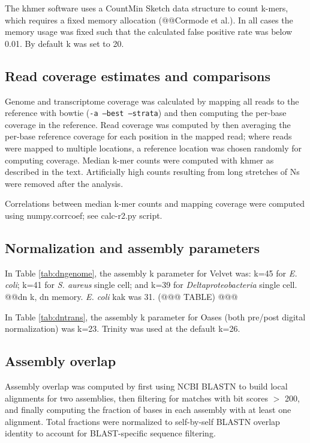 \documentclass[10pt]{article}
\begin{document}
The khmer software uses a CountMin Sketch data structure to count k-mers,
which requires a fixed memory allocation (@@Cormode et al.).  In all cases
the memory usage was fixed such that the calculated false positive rate was
below 0.01.  By default k was set to 20.

\subsection*{Read coverage estimates and comparisons}

Genome and transcriptome coverage was calculated by mapping all reads
to the reference with bowtie ({\tt -a --best --strata}) and then
computing the per-base coverage in the reference.  Read coverage was
computed by then averaging the per-base reference coverage for each
position in the mapped read; where reads were mapped to multiple
locations, a reference location was chosen randomly for computing
coverage.  Median k-mer counts were computed with khmer as described
in the text.  Artificially high counts resulting from long stretches
of Ns were removed after the analysis.

Correlations between median k-mer counts and mapping coverage were
computed using numpy.corrcoef; see calc-r2.py script.

\subsection*{Normalization and assembly parameters}

In Table \ref{tab:dngenome}, the assembly k parameter for Velvet was:
k=45 for {\em E. coli}; k=41 for {\em S. aureus} single cell; and k=39
for {\em Deltaproteobacteria} single cell.  @@dn k, dn memory.
{\em E. coli} kak was 31.  (@@@ TABLE) @@@

In Table \ref{tab:dntrans}, the assembly k parameter for Oases (both
pre/post digital normalization) was k=23.  Trinity was used at the
default k=26.

\subsection*{Assembly overlap}

Assembly overlap was computed by first using NCBI BLASTN to build local
alignments for two assemblies, then filtering for matches with bit scores
$>$ 200, and finally computing the fraction of bases in each assembly
with at least one alignment.  Total fractions were normalized to
self-by-self BLASTN overlap identity to account for BLAST-specific
sequence filtering.
\end{document}
